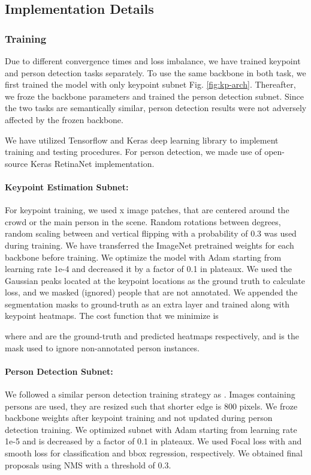 \documentclass[runningheads]{llncs}
\begin{document}
\subsection{Implementation Details} 
\subsubsection{Training}
Due to different convergence times and loss imbalance, we have trained keypoint and person detection tasks separately. To use the same backbone in both task, we first trained the model with only keypoint subnet Fig. \ref{fig:kp-arch}. Thereafter, we froze the backbone parameters and trained the person detection subnet. Since the two tasks are semantically similar, person detection results were not adversely affected by the frozen backbone. 


We have utilized Tensorflow \cite{tensorflow2015-whitepaper} and Keras \cite{chollet2015keras} deep learning library to implement training and testing procedures. For person detection, we made use of open-source Keras RetinaNet\cite{hans_gaiser_2018_1188105} implementation.
\paragraph{Keypoint Estimation Subnet:} 
For keypoint training, we used x image patches, that are centered around the crowd or the main person in the scene. Random rotations between  degrees, random scaling between  and vertical flipping with a probability of 0.3 was used during training. We have transferred the ImageNet \cite{imagenet} pretrained weights for each backbone before training. We optimize the model with Adam \cite{Kingma} starting from learning rate 1e-4 and decreased it by a factor of 0.1 in plateaux. We used the Gaussian peaks located at the keypoint locations as the ground truth to calculate  loss, and we masked (ignored) people that are not annotated. We appended the segmentation masks to ground-truth as an extra layer and trained along with keypoint heatmaps. The cost function that we minimize is 









\noindent where  and  are the ground-truth and predicted heatmaps respectively, and  is the mask used to ignore non-annotated person instances. 
\paragraph{Person Detection Subnet:} 
We followed a similar person detection training strategy as \cite{Lin2017}. Images containing persons are used, they are resized such that shorter edge is 800 pixels. We froze backbone weights after keypoint training and not updated during person detection training. We optimized subnet with Adam \cite{Kingma} starting from learning rate 1e-5 and is decreased by a factor of 0.1 in plateaux. We used Focal loss with  and smooth  loss for classification and bbox regression, respectively. We obtained final proposals using NMS with a threshold of 0.3.
\end{document}
